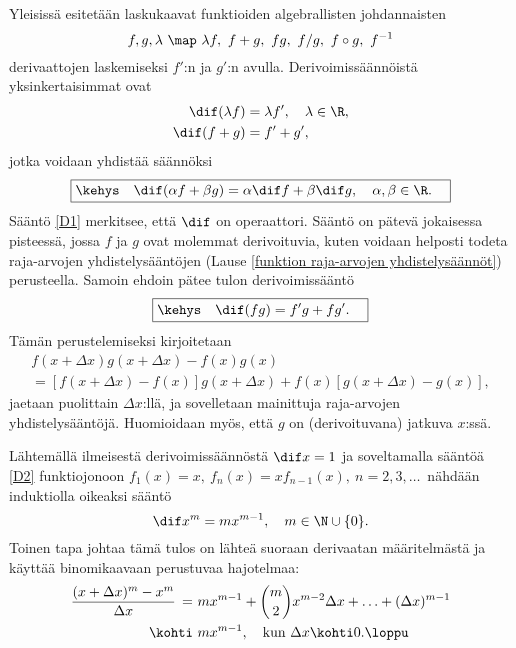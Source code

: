 Yleisissä  esitetään laskukaavat funktioiden algebrallisten
johdannaisten 
\[
f,g,\lambda\ \map\ \lambda f,\ f+g,\ fg,\ f/g,\ f \circ g,\ f^{-1}
\]
derivaattojen laskemiseksi $f'$:n ja $g'$:n avulla. Derivoimissäännöistä yksinkertaisimmat
ovat
\begin{align*}
\dif(\lambda f) &= \lambda f', \quad \lambda\in\R, \\
\dif(f+g)       &= f'+g',
\end{align*}
jotka voidaan yhdistää säännöksi
\begin{equation} \label{D1}
\boxed{\kehys\quad \dif(\alpha f + \beta g)=\alpha \dif f + \beta \dif g, \quad 
                   \alpha,\beta\in\R. \quad}
\end{equation}
%
Sääntö \eqref{D1} merkitsee, että $\dif$ on  operaattori. Sääntö on pätevä
jokaisessa pisteessä, jossa $f$ ja $g$ ovat molemmat derivoituvia, kuten voidaan helposti
todeta raja-arvojen yhdistelysääntöjen (Lause \ref{funktion raja-arvojen yhdistelysäännöt})
perusteella. Samoin ehdoin pätee tulon derivoimissääntö
\begin{equation} \label{D2}
\boxed{\kehys\quad \dif(fg)=f'g+fg'. \quad}
\end{equation}
Tämän perustelemiseksi kirjoitetaan
\begin{multline*}
f(x+\Delta x)g(x+\Delta x)-f(x)g(x) \\
              =[f(x+\Delta x)-f(x)]g(x+\Delta x)+f(x)[g(x+\Delta x)-g(x)],
\end{multline*}
jaetaan puolittain $\Delta x$:llä, ja sovelletaan mainittuja raja-arvojen 
yhdistelysääntöjä. Huomioidaan myös, että $g$ on (derivoituvana) jatkuva $x$:ssä. 
\begin{Exa} \label{potderiv 1} Lähtemällä ilmeisestä derivoimissäännöstä $\dif x = 1$ ja 
soveltamalla sääntöä \eqref{D2} funktiojonoon
$f_1(x) = x,\ f_n(x)=xf_{n-1}(x),\ n = 2,3,\ldots\,$ nähdään induktiolla oikeaksi sääntö 
\[
\dif x^m=mx^{m-1}, \quad m\in\N\cup\{0\}.
\]
Toinen tapa johtaa tämä tulos on lähteä suoraan derivaatan määritelmästä ja käyttää
binomikaavaan perustuvaa hajotelmaa:
\begin{align*}
\frac{(x+\Delta x)^m-x^m}{\Delta x}\,=\ 
                      &mx^{m-1}+\binom{m}{2}x^{m-2}\Delta x + \ldots +(\Delta x)^{m-1} \\
              \kohti\ &mx^{m-1}, \quad \text{kun}\ \Delta x \kohti 0. \loppu
\end{align*}
\end{Exa}

